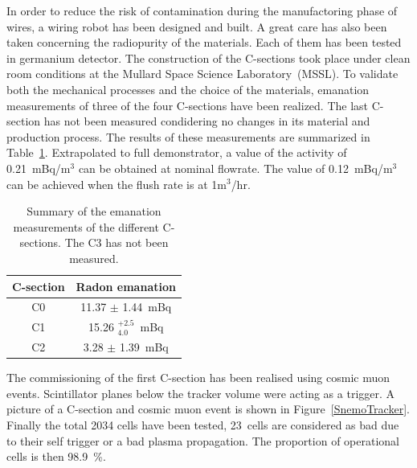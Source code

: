 \documentclass[main.tex]{subfiles}
\begin{document}
 


\bigskip


\NI In order to reduce the risk of contamination during the manufactoring phase of wires, a wiring robot has been designed and built. A great care has also been taken concerning the radiopurity of the materials. Each of them has been tested in germanium detector. The construction of the C-sections took place under clean room conditions at the Mullard Space Science Laboratory~(MSSL). To validate both the mechanical processes and the choice of the materials, emanation measurements of three of the four C-sections have been realized. The last C-section has not been measured condidering no changes in its material and production process. The results of these measurements are summarized in Table~\ref{tab:RadonEmanation}. Extrapolated to full demonstrator, a value of the activity of 0.21~mBq/m$^{\text{3}}$ can be obtained at nominal flowrate. The value of 0.12~mBq/m$^{\text{3}}$ can be achieved when the flush rate is at 1m$^{\text{3}}$/hr.


\begin{table}[h!]
\centering
\begin{tabular}{c|c}
\toprule
C-section & Radon emanation \\
\hline	
C0 & 11.37 $\pm$ 1.44~mBq \\
C1 & 15.26 $^{+\text{2.5}}_{\text{4.0}}$~mBq \\
C2 & 3.28 $\pm$ 1.39~mBq \\
\bottomrule
\end{tabular}
\caption{Summary of the emanation measurements of the different C-sections. The C3 has not been measured.}
\label{tab:RadonEmanation}
\end{table}


\bigskip


\NI The commissioning of the first C-section has been realised using cosmic muon events. Scintillator planes below the tracker volume were acting as a trigger. A picture of a C-section and cosmic muon event is shown in Figure~\ref{SnemoTracker}. Finally the total 2034 cells have been tested, 23~cells are considered as bad due to their self trigger or a bad plasma propagation. The proportion of operational cells is then 98.9~\%. 
\end{document}
